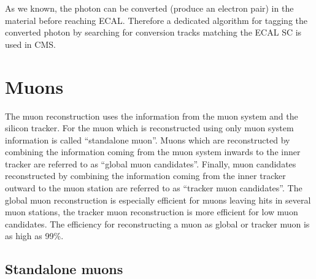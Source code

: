 As we known, the photon can be converted (produce an electron pair) in the material before reaching ECAL. Therefore a dedicated algorithm for tagging the converted photon by searching for conversion tracks matching the ECAL SC is used in CMS.

%

\section{Muons}\label{sec:muon}
The muon reconstruction uses the information from the muon system and the silicon tracker. For the muon which is reconstructed using only muon system information is called ``standalone muon''. Muons which are reconstructed by combining the information coming from the muon system inwards to the inner tracker are referred to as ``global muon candidates''. Finally, muon candidates reconstructed by combining the information coming from the inner tracker outward to the muon station are referred to as ``tracker muon candidates''. The global muon reconstruction is especially efficient for muons leaving hits in several muon stations, the tracker muon reconstruction
is more efficient for low \et muon candidates. The efficiency for reconstructing a muon as global or tracker muon is as high as 99\%.

\subsection*{Standalone muons}\label{subsec:Standalone_muon}

